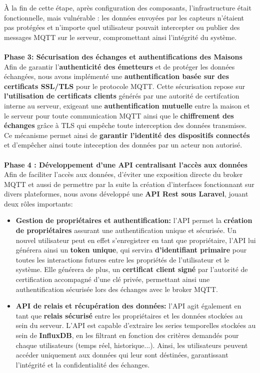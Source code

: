 \documentclass[10pt, a4paper]{report}
\begin{document}
	À la fin de cette étape, après configuration des composants, l’infrastructure était fonctionnelle, mais vulnérable : les données envoyées par les capteurs n’étaient pas protégées et n’importe quel utilisateur pouvait intercepter ou publier des messages MQTT sur le serveur, compromettant ainsi l’intégrité du système.\\\\
	\textbf{Phase 3: Sécurisation des échanges et authentifications des Maisons}\\
	Afin de garantir l'\textbf{authenticité des émetteurs} et de protéger les données échangées, nous avons implémenté une \textbf{authentification basée sur des certificats SSL/TLS} pour le protocole MQTT. Cette sécurisation repose sur \textbf{l'utilisation de certificats clients} générés par une autorité de certifcation interne au serveur, exigeant une \textbf{authentification mutuelle} entre la maison et le serveur pour toute communication MQTT ainsi que le \textbf{chiffrement des échanges} grâce à TLS qui empêche toute interception des données transmises.\\
	Ce mécanisme permet ainsi de \textbf{garantir l'identité des dispositifs connectés} et d'empêcher ainsi toute inteception des données par un acteur non autorisé.\\\\
	\textbf{Phase 4 : Développement d’une API centralisant l’accès aux données}\\
	Afin de faciliter l'accès aux données, d'éviter une exposition directe du broker MQTT et aussi de permettre par la suite la création d'interfaces fonctionnant sur divers plateformes, nous avons développé une \textbf{API Rest sous Laravel}, jouant deux rôles importants:\\
	\begin{itemize}
		\item \textbf{Gestion de propriétaires et authentification:} l'API permet la \textbf{création de propriétaires} assurant une authentification unique et sécurisée. Un nouvel utilisateur peut en effet s'enregistrer en tant que propriétaire, l'API lui générera ainsi un \textbf{token unique}, qui servira \textbf{d'identifiant primaire} pour toutes les interactions futures entre les propriétés de l'utilisateur et le système. Elle générera de plus, un \textbf{certificat client signé} par l'autorité de certification accompagné d'une clé privée, permettant ainsi une authentification sécurisée lors des échanges avec le broker MQTT.
		
		\item \textbf{API de relais et récupération des données: } l'API agit également en tant que \textbf{relais sécurisé} entre les propriétaires et les données stockées au sein du serveur. L'API est capable d'extraire les series temporelles stockées au sein de \textbf{InfluxDB}, en les filtrant en fonction des critères demandés pour chaque utilisateurs (temps réel, historique...). Ainsi, les utilisateurs peuvent accéder uniquement aux données qui leur sont déstinées, garantissant l'intégrité et la confidentialité des échanges.\\
	\end{itemize}
	 
\end{document}
